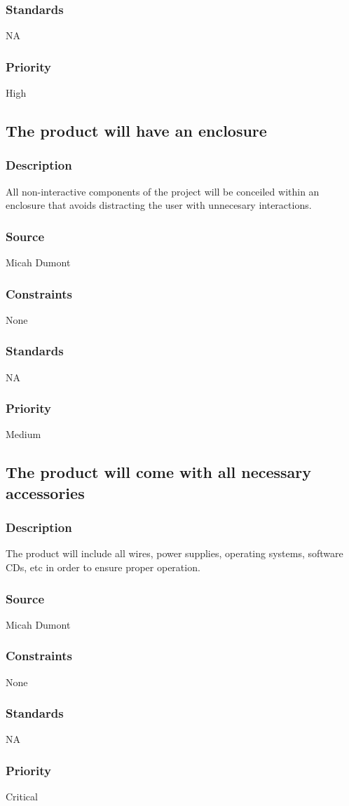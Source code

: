 \subsubsection{Standards}
NA
\subsubsection{Priority}
High

\subsection{The product will have an enclosure}
\subsubsection{Description}
All non-interactive components of the project will be conceiled within an enclosure that avoids distracting the user with unnecesary interactions.
\subsubsection{Source}
Micah Dumont
\subsubsection{Constraints}
None
\subsubsection{Standards}
NA
\subsubsection{Priority}
Medium

\subsection{The product will come with all necessary accessories}
\subsubsection{Description}
The product will include all wires, power supplies, operating systems, software CDs, etc in order to ensure proper operation.
\subsubsection{Source}
Micah Dumont
\subsubsection{Constraints}
None
\subsubsection{Standards}
NA
\subsubsection{Priority}
Critical
